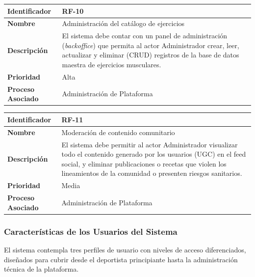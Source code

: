 \documentclass[12pt]{article}
\begin{document}
\begin{table}[h!]
    \centering
    \renewcommand{\arraystretch}{1.3}
    \begin{tabular}{|p{3.5cm}|p{11.5cm}|}
        \hline
        \rowcolor[HTML]{EFEFEF} 
        \textbf{Identificador} & \textbf{RF-10} \\ \hline
        \textbf{Nombre} & Administración del catálogo de ejercicios \\ \hline
        \textbf{Descripción} & El sistema debe contar con un panel de administración (\textit{backoffice}) que permita al actor Administrador crear, leer, actualizar y eliminar (CRUD) registros de la base de datos maestra de ejercicios musculares. \\ \hline
        \textbf{Prioridad} & Alta \\ \hline
        \textbf{Proceso Asociado} & Administración de Plataforma \\ \hline
    \end{tabular}
\end{table}

\begin{table}[h!]
    \centering
    \renewcommand{\arraystretch}{1.3}
    \begin{tabular}{|p{3.5cm}|p{11.5cm}|}
        \hline
        \rowcolor[HTML]{EFEFEF} 
        \textbf{Identificador} & \textbf{RF-11} \\ \hline
        \textbf{Nombre} & Moderación de contenido comunitario \\ \hline
        \textbf{Descripción} & El sistema debe permitir al actor Administrador visualizar todo el contenido generado por los usuarios (UGC) en el feed social, y eliminar publicaciones o recetas que violen los lineamientos de la comunidad o presenten riesgos sanitarios. \\ \hline
        \textbf{Prioridad} & Media \\ \hline
        \textbf{Proceso Asociado} & Administración de Plataforma \\ \hline
    \end{tabular}
\end{table}
\newpage

\subsubsection{Características de los Usuarios del Sistema}
El sistema contempla tres perfiles de usuario con niveles de acceso diferenciados, diseñados para cubrir desde el deportista principiante hasta la administración técnica de la plataforma.
\end{document}

